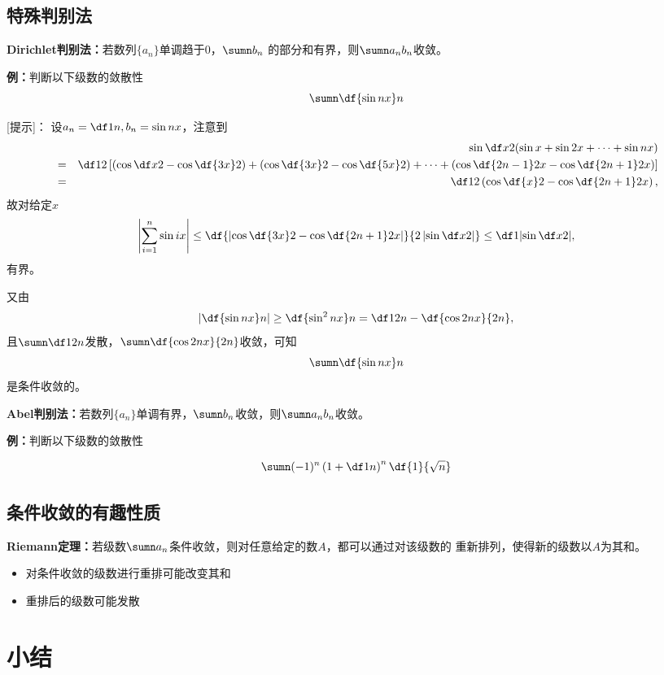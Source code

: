 \begin{shaded}

\subsection{特殊判别法}

{\bf Dirichlet判别法：}若数列$\{a_n\}$单调趋于$0$，$\sumn b_n$
  的部分和有界，则$\sumn a_nb_n$收敛。
  
{\bf 例：}判断以下级数的敛散性
$$\sumn\df{\sin nx}n$$

[提示]：
设$a_n=\df1n,b_n=\sin nx$，注意到
\begin{eqnarray*}
&&\sin\df x2(\sin x+\sin2x+\cdots+\sin nx)\\
&=&\df12\left[\left(\cos\df x2-\cos\df{3x}2\right)+
\left(\cos\df {3x}2-\cos\df{5x}2\right)+\cdots+
\left(\cos\df {2n-1}2x-\cos\df{2n+1}2x\right)\right]\\
&=&\df12\left(\cos\df{x}2-\cos\df{2n+1}2x\right),
\end{eqnarray*}
故对给定$x$
$$\left|\sum\limits_{i=1}^n\sin ix\right|
\leq\df{\left|\cos\df{3x}2-\cos\df{2n+1}2x\right|}{2\left|\sin\df x2\right|}
\leq\df1{\left|\sin\df x2\right|},$$
有界。

又由
$$\left|\df{\sin nx}n\right|\geq\df{\sin^2nx}n=\df1{2n}-\df{\cos2nx}{2n},$$
且$\sumn\df1{2n}$发散，$\sumn\df{\cos2nx}{2n}$收敛，可知
$$\sumn\df{\sin nx}n$$是条件收敛的。

{\bf Abel判别法：}若数列$\{a_n\}$单调有界，$\sumn b_n$收敛，则$\sumn a_nb_n$收敛。

{\bf 例：}判断以下级数的敛散性

$$\sumn(-1)^n\left(1+\df 1n\right)^n\df{1}{\sqrt n}$$ 

\subsection{条件收敛的有趣性质}

{\bf Riemann定理：}若级数$\sumn a_n$条件收敛，则对任意给定的数$A$，都可以通过对该级数的
重新排列，使得新的级数以$A$为其和。

\begin{itemize}
  \item 对条件收敛的级数进行重排可能改变其和
  \item 重排后的级数可能发散
\end{itemize}

\end{shaded}

\section{小结}

